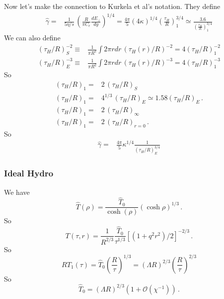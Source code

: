 \documentclass[12pt,aps,preprint,nofootinbib,noshowkeys,noshowpacs,longbibliography,superscriptaddress,tightenlines]{revtex4-2}
\def\Kinf{\kappa}
\begin{document}
Now let's make the connection to Kurkela et al's notation.  They define
\begin{align}
 \hat{\gamma} =& \frac{1}{5\eta/s} \, \left( \frac{R}{\pi C_e} \frac{
 dE_\perp}{dy}  \right)^{1/4}  = \frac{4 \pi}{5} \left(4 \Kinf \right)^{1/4}
 \left(\frac{\tau_H}{R} \right)^{3/4}_1\simeq  \frac{3.6}
 { \left(\frac{\tau_H}{R} \right)^{3/4}_1 }
\end{align}
We can also define 
\begin{align}
  (\tau_H/R)_S^{-2}   \equiv&  \frac{1}{\pi R^2}\int 2\pi r dr \,  (\tau_H(r)/R)^{-2}  = 4 (\tau_H/R)_1^{-2} \\
  (\tau_H/R)_E^{-3} \equiv&  \frac{1}{\pi R^2}\int 2\pi r dr \,  (\tau_H(r)/R)^{-3}  = 4 (\tau_H/R)_1^{-3}
\end{align}
 So 
 \begin{align}
 \left(\tau_{H}/R\right)_1 =& 2  \, (\tau_{H}/R)_S  \\
  \left(\tau_{H}/R \right)_1 =& 4^{1/3} \, (\tau_H/R)_E \simeq 1.58 (\tau_H/R)_E \, . \\
  \left(\tau_{H}/R \right)_1 = & 2 \, (\tau_H/R)_\infty   \\
  \left(\tau_{H}/R \right)_1 = & 2 \, (\tau_H/R)_{r=0} \, .
 \end{align}
So 
\begin{align}
\hat{\gamma} =& \frac{4 \pi}{5}  \Kinf^{1/4}  \frac{1}{(\tau_H/R)_E^{3/4}}
\end{align}





\subsubsection{Ideal Hydro} 

We have 
\begin{equation}
  \hat{T}(\rho) = \frac{\hat{T}_0}{\cosh(\rho)} (\cosh\rho)^{1/3} \, .
\end{equation}
So 
\begin{equation}
  T(\tau, r) = \frac{1}{R^{2/3}} \frac{\hat{T}_0}{\tau^{1/3}} \left[ (1 + q^2 r^2)/2 \right]^{-2/3} \, .
\end{equation}
So 
\begin{equation}
   R T_1(\tau) = \hat{T}_0 \left( \frac{R}{\tau} \right)^{1/3}  = (\Lambda R)^{2/3} \left( \frac{R}{\tau} \right)^{2/3}
\end{equation}
So
\begin{equation}
\hat{T}_0 = (\Lambda R)^{2/3} \left(1 + \mathcal O(\chi^{-1}) \right)\, .
\end{equation}
\end{document}
